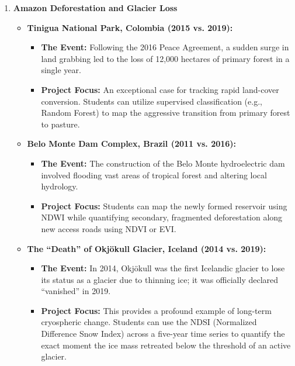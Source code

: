 \documentclass{article}
\begin{document}
\begin{enumerate}
    \item \textbf{Amazon Deforestation and Glacier Loss}
    \begin{itemize}
        \item \textbf{Tinigua National Park, Colombia (2015 vs. 2019):}
        \begin{itemize}
            \item \textbf{The Event:} Following the 2016 Peace Agreement, a sudden surge in land grabbing led to the loss of 12,000 hectares of primary forest in a single year.
            \item \textbf{Project Focus:} An exceptional case for tracking rapid land-cover conversion. Students can utilize supervised classification (e.g., Random Forest) to map the aggressive transition from primary forest to pasture.
        \end{itemize}
        \item \textbf{Belo Monte Dam Complex, Brazil (2011 vs. 2016):}
        \begin{itemize}
            \item \textbf{The Event:} The construction of the Belo Monte hydroelectric dam involved flooding vast areas of tropical forest and altering local hydrology.
            \item \textbf{Project Focus:} Students can map the newly formed reservoir using NDWI while quantifying secondary, fragmented deforestation along new access roads using NDVI or EVI.
        \end{itemize}
        \item \textbf{The ``Death'' of Okjökull Glacier, Iceland (2014 vs. 2019):}
        \begin{itemize}
            \item \textbf{The Event:} In 2014, Okjökull was the first Icelandic glacier to lose its status as a glacier due to thinning ice; it was officially declared ``vanished'' in 2019.
            \item \textbf{Project Focus:} This provides a profound example of long-term cryospheric change. Students can use the NDSI (Normalized Difference Snow Index) across a five-year time series to quantify the exact moment the ice mass retreated below the threshold of an active glacier.
        \end{itemize}
    \end{itemize}


\end{enumerate}
\end{document}
